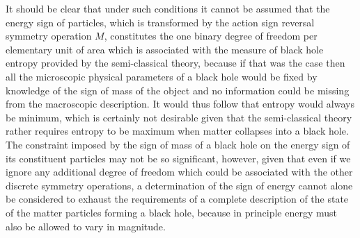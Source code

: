 \documentclass[notitlepage,12pt]{report}
\begin{document}
It should be clear that under such conditions it cannot be assumed that the energy sign of particles, which is transformed by the action sign reversal symmetry operation $M$, constitutes the one binary degree of freedom per elementary unit of area which is associated with the measure of black hole entropy provided by the semi-classical theory, because if that was the case then all the microscopic physical parameters of a black hole would be fixed by knowledge of the sign of mass of the object and no information could be missing from the macroscopic description. It would thus follow that entropy would always be minimum, which is certainly not desirable given that the semi-classical theory rather requires entropy to be maximum when matter collapses into a black hole. The constraint imposed by the sign of mass of a black hole on the energy sign of its constituent particles may not be so significant, however, given that even if we ignore any additional degree of freedom which could be associated with the other discrete symmetry operations, a determination of the sign of energy cannot alone be considered to exhaust the requirements of a complete description of the state of the matter particles forming a black hole, because in principle energy must also be allowed to vary in magnitude.
\end{document}
